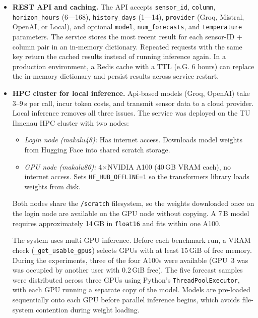 \documentclass[11pt,a4paper]{article}
\begin{document}
\begin{itemize}[leftmargin=*]
\item \textbf{REST API and caching.}
The API accepts \texttt{sensor\_id}, \texttt{column}, \texttt{horizon\_hours} (6—168), \texttt{history\_days} (1—14), \texttt{provider} (Groq, Mistral, OpenAI, or Local), and optional \texttt{model}, \texttt{num\_forecasts}, and \texttt{temperature} parameters. The service stores the most recent result for each sensor-ID + column pair in an in-memory dictionary. Repeated requests with the same key return the cached results instead of running inference again. In a production environment, a Redis cache with a TTL (e.G. 6 hours) can replace the in-memory dictionary and persist results across service restart.

\item \textbf{HPC cluster for local inference.}
Api-based models (Groq, OpenAI) take  3--9\,s per call, incur token costs, and transmit sensor data to a cloud provider.
Local inference removes all three issues.
The service was deployed on the TU Ilmenau HPC cluster with two nodes:
\begin{itemize}[leftmargin=2em,itemsep=1pt]
  \item \textit{Login node (makalu48):} Has internet access. Downloads model weights from Hugging Face into shared scratch storage.
  \item \textit{GPU node (makalu86):} 4$\times$NVIDIA A100 (40\,GB VRAM each), no internet access. Sets \texttt{HF\_HUB\_OFFLINE=1} so the transformers library loads weights from disk.
\end{itemize}
Both nodes share the \texttt{/scratch} filesystem, so the weights downloaded once on the login node are available on the GPU node without copying.
A 7\,B model requires approximately  14\,GB in \texttt{float16} and fits within one A100.

The system uses multi-GPU inference. Before each benchmark run, a VRAM check (\texttt{\_get\_usable\_gpus}) selects GPUs with at least 15\,GiB of free memory. During the experiments, three of the four A100s were available (GPU~3 was was occupied by another user with 0.2\,GiB free).
The five forecast samples were distributed across three GPUs using Python’s \texttt{ThreadPoolExecutor}, with each GPU running a separate copy of the model. Models are pre-loaded sequentially onto each GPU before parallel inference begins, which avoids file-system contention during weight loading.

\end{itemize}
\end{document}

